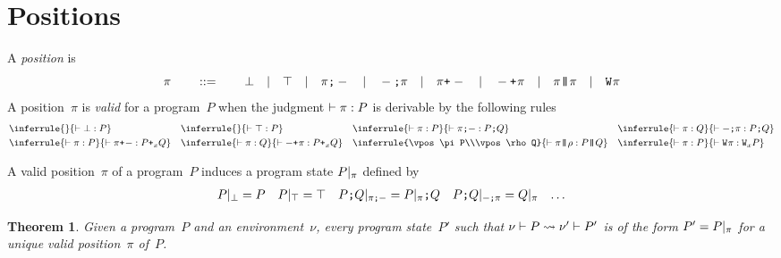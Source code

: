\documentclass[a4paper]{article}
\theoremstyle{theorem}
\newtheorem{theorem}{Theorem}
\newtheorem{lemma}[theorem]{Lemma}
\theoremstyle{example}
\theoremstyle{remark}
\newtheorem{remark}[theorem]{Remark}
\begin{document}
\section{Positions}
A \emph{position} is
\[
  \pi
  \qquad::=\qquad
  \bot
  \quad|\quad
  \top
  \quad|\quad
  \pi\texttt{;}-
  \quad|\quad
  -\texttt{;}\pi
  \quad|\quad
  \pi\texttt{+}_{}-
  \quad|\quad
  -\texttt{+}_{}\pi
  \quad|\quad
  \pi\texttt{|\!\!|}\pi
  \quad|\quad
  \texttt{W}_{}\pi
\]
A position~$\pi$ is \emph{valid} for a program~$P$ when the judgment
$\vdash \pi:P$ is derivable by the following rules
\begin{align*}
  &
  \inferrule{\null}{\vpos\pbot P}
  &&
  \inferrule{\null}{\vpos\ptop P}
  &&
  \inferrule{\vpos\pi P}{\vpos{\pseql\pi}{\pseq PQ}}
  &&
  \inferrule{\vpos\pi Q}{\vpos{\pseqr\pi}{\pseq PQ}}
  \\
  &
  \inferrule{\vpos\pi P}{\vpos{\porl\pi}{\por xPQ}}
  &&
  \inferrule{\vpos\pi Q}{\vpos{\porr\pi}{\por xPQ}}
  &&
  \inferrule{\vpos\pi P\\\vpos\rho Q}{\vpos{\ppar\pi\rho}{\ppar PQ}}
  &&
  \inferrule{\vpos\pi P}{\vpos{\ploopl\pi}{\ploop xP}}
\end{align*}





A valid position~$\pi$ of a program~$P$ induces a program state $P|_{\pi}$
defined by
\begin{align*}
  P|_{\bot}&=P
  &
  P|_{\top}&=\top
  &
  P\texttt{;}Q|_{\pi\texttt{;}-}&=P|_{\pi}\texttt{;}Q
  &
  P\texttt{;}Q|_{-\texttt{;}\pi}&=Q|_{\pi}
  &
  \ldots
\end{align*}

\begin{theorem}
  Given a program~$P$ and an environment~$\nu$, every program state~$P'$ such
  that $\nu\vdash P\rightsquigarrow\nu'\vdash P'$ is of the form $P'=P|_{\pi}$ for a
  unique valid position~$\pi$ of~$P$.
\end{theorem}
\end{document}
